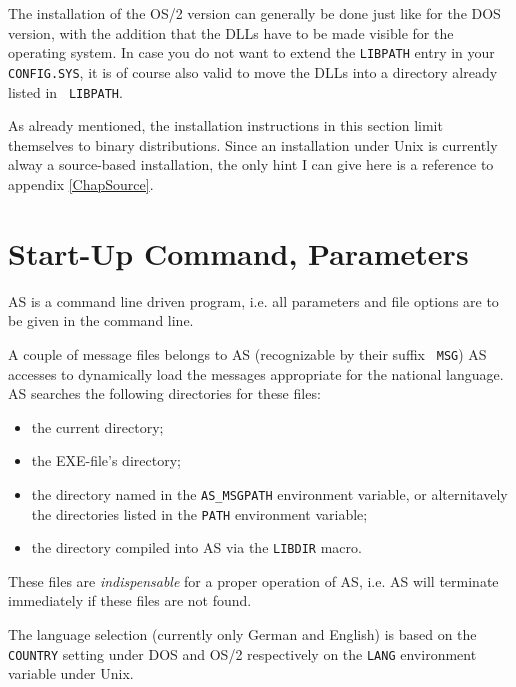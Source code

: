 \documentclass[12pt,twoside]{report}
\newcommand{\asname}{{AS}}
\begin{document}
The installation of the OS/2 version  can generally
be done just like for the DOS version, with the addition that the DLLs
have to be made visible for the operating system. In case you do not want
to extend the {\tt LIBPATH} entry in your {\tt CONFIG.SYS}, it is of
course also valid to move the DLLs into a directory already listed in {\tt
LIBPATH}.

As already mentioned, the installation instructions in this section limit
themselves to binary distributions.  Since an installation under Unix
 is currently alway a source-based installation, the
only hint I can give here is a reference to appendix \ref{ChapSource}.


\section{Start-Up Command, Parameters}
\label{SectCallConvention}

\asname{} is a command line driven program, i.e. all parameters and file
options are to be given in the command line.

A couple of message files belongs to \asname{} (recognizable by their suffix {\tt
MSG}) \asname{} accesses to dynamically load the messages appropriate for the
national language.  \asname{} searches the following directories for these files:
\begin{itemize}
\item{the current directory;}
\item{the EXE-file's directory;}
\item{the directory named in the {\tt AS\_MSGPATH} environment variable,
      or alternitavely the directories listed in the {\tt PATH} environment
      variable;}
\item{the directory compiled into \asname{} via the {\tt LIBDIR} macro.}
\end{itemize}
These files are {\em indispensable} for a proper operation of \asname{}, i.e. \asname{}
will terminate immediately if these files are not found.

The language selection (currently only German and English) is based on the
{\tt COUNTRY} setting under DOS and OS/2 respectively on the {\tt LANG}
environment variable under Unix.
\end{document}
